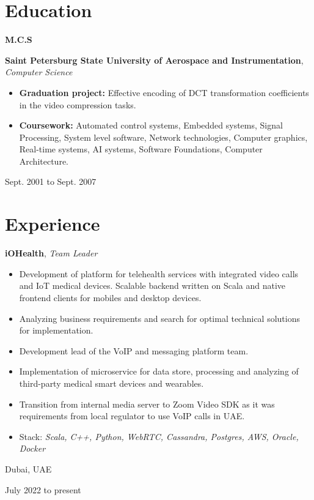 \documentclass[10pt, letterpaper]{article}
\newenvironment{highlights}{
    \begin{itemize}[
        topsep=0.10 cm,
        parsep=0.10 cm,
        partopsep=0pt,
        itemsep=0pt,
        leftmargin=0.4 cm + 10pt
    ]
}{
    \end{itemize}
} %
\newenvironment{twocolentry}[2][]{
    \onecolentry
    \def\secondColumn{#2}
    \setcolumnwidth{\fill, 4.5 cm}
    \begin{paracol}{2}
}{
    \switchcolumn \raggedleft \secondColumn
    \end{paracol}
    \endonecolentry
} %
\newenvironment{threecolentry}[3][]{
    \onecolentry
    \def\thirdColumn{#3}
    \setcolumnwidth{1 cm, \fill, 4.5 cm}
    \begin{paracol}{3}
    {\raggedright #2} \switchcolumn
}{
    \switchcolumn \raggedleft \thirdColumn
    \end{paracol}
    \endonecolentry
} %
\begin{document}
    
    \section{Education}

        
        \begin{threecolentry}{\textbf{M.C.S}}{
            Sept. 2001 to Sept. 2007
        }
            \textbf{Saint Petersburg State University of Aerospace and Instrumentation}, \textit{Computer Science}
            \begin{highlights}
                \item \textbf{Graduation project:} Effective encoding of DCT transformation coefficients in the video compression tasks.
                \item \textbf{Coursework:} Automated control systems, Embedded systems, Signal Processing, System level software, Network technologies, Computer graphics, Real-time systems, AI systems, Software Foundations, Computer Architecture.
            \end{highlights}
        \end{threecolentry}


    
    \section{Experience}

        
        \begin{twocolentry}{
            Dubai, UAE

        July 2022 to present
        }
            \textbf{iOHealth}, \textit{Team Leader}
            \begin{highlights}
                \item Development of platform for telehealth services with integrated video calls and IoT medical devices. Scalable backend written on Scala and native frontend clients for mobiles and desktop devices.
                \item Analyzing business requirements and search for optimal technical solutions for implementation.
                \item Development lead of the VoIP and messaging platform team.
                \item Implementation of microservice for data store, processing and analyzing of third-party medical smart devices and wearables.
                \item Transition from internal media server to Zoom Video SDK as it was requirements from local regulator to use VoIP calls in UAE.
                \item Stack: \textit{Scala, C++, Python, WebRTC, Cassandra, Postgres, AWS, Oracle, Docker}
            \end{highlights}
        \end{twocolentry}
\end{document}
